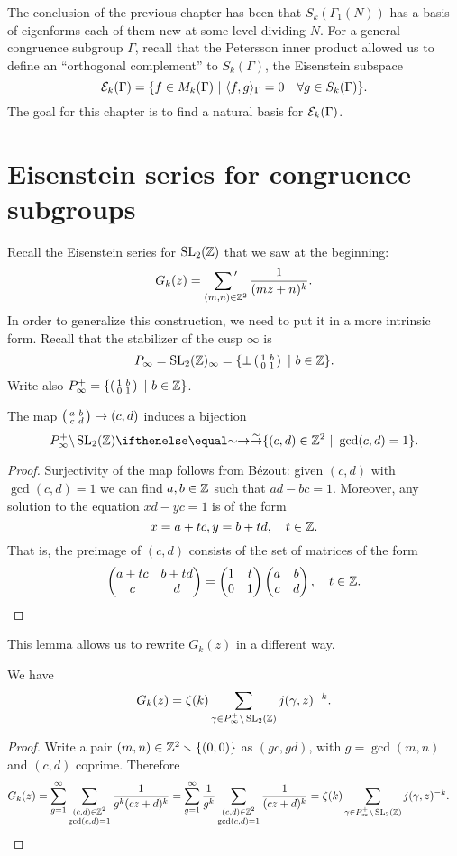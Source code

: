 
The conclusion of the previous chapter has been that $S_k(\Gamma_1(N))$ has a
basis of eigenforms each of them new at some level dividing $N$. For a general congruence
subgroup $\Gamma$, recall that
the Petersson inner product allowed us to define an ``orthogonal complement'' to
$S_k(\Gamma)$, the Eisenstein subspace
\[
\mathcal{E}_k(\Gamma)=\{f\in M_k(\Gamma) ~|~ \langle f,g\rangle_\Gamma=0\quad \forall g\in S_k(\Gamma)\}.
\]
The goal for this chapter is to find a natural basis for $\mathcal{E}_k(\Gamma)$.

\section{Eisenstein series for congruence subgroups}
Recall the Eisenstein series  for $\operatorname{SL}_2(\mathbb{Z})$ that we saw at the beginning:
\[
G_k(z)=\sumprime_{(m,n)\in\ZZ^2} \frac{1}{(mz+n)^k}.
\]
In order to generalize this construction, we need to put it in a more intrinsic form. Recall that the stabilizer of the cusp $\infty$ is
\[
P_\infty = \operatorname{SL}_2(\mathbb{Z})_\infty = \{\pm \left(\begin{smallmatrix}1&b\\0&1\end{smallmatrix}\right) ~|~ b\in\mathbb{Z}\}.
\]
Write also $P_\infty^+=\{\left(\begin{smallmatrix}1&b\\0&1\end{smallmatrix}\right) ~|~ b\in\mathbb{Z}\}$.

\begin{lemma}
  The map $\left(\begin{smallmatrix}a&b\\c&d\end{smallmatrix}\right)\mapsto (c,d)$ induces  a bijection
\[
P_\infty^+\backslash \SL_2(\ZZ)\tto{\sim} \{(c,d)\in\ZZ^2~|~\gcd(c,d)=1\}.
\]
\end{lemma}
\begin{proof}
  Surjectivity of the map follows from B\'ezout: given $(c,d)$ with $\gcd(c,d)=1$ we can find $a,b\in\mathbb{Z}$ such that $ad-bc = 1$. Moreover, any solution to the equation $xd-yc = 1$ is of the form
\[
x = a+tc, y = b+td,\quad t\in \mathbb{Z}.
\]
That is, the preimage of $(c,d)$ consists of the set of matrices of the form
\[
\left(\begin{matrix}a+tc&b+td\\c&d\end{matrix}\right) = \left(\begin{matrix}1&t\\0&1\end{matrix}\right)\left(\begin{matrix}a&b\\c&d\end{matrix}\right),\quad t\in\mathbb{Z}.
\]
\end{proof}

This lemma allows us to rewrite $G_k(z)$ in a different way.
\begin{proposition}
  We have
\[
G_k(z)=\zeta(k)\sum_{\gamma\in P_\infty^+\backslash \operatorname{SL}_2(\mathbb{Z})} j(\gamma,z)^{-k}.
\]
\end{proposition}
\begin{proof}
  Write a pair $(m,n)\in\mathbb{Z}^2\smallsetminus \{(0,0)\}$ as $(gc,gd)$, with $g=\gcd(m,n)$ and $(c,d)$ coprime. Therefore
\begin{align*}
G_k(z)&=\sum_{g=1}^\infty \sum_{\substack{(c,d)\in\mathbb{Z}^2\\\gcd(c,d)=1}} \frac{1}{g^k(cz+d)^k}=\sum_{g=1}^\infty \frac{1}{g^k} \sum_{\substack{(c,d)\in\mathbb{Z}^2\\\gcd(c,d)=1}} \frac{1}{(cz+d)^k}=\zeta(k) \sum_{\gamma\in P_\infty^+\backslash\operatorname{SL}_2(\mathbb{Z})} j(\gamma,z)^{-k}.
\end{align*}
\end{proof}

